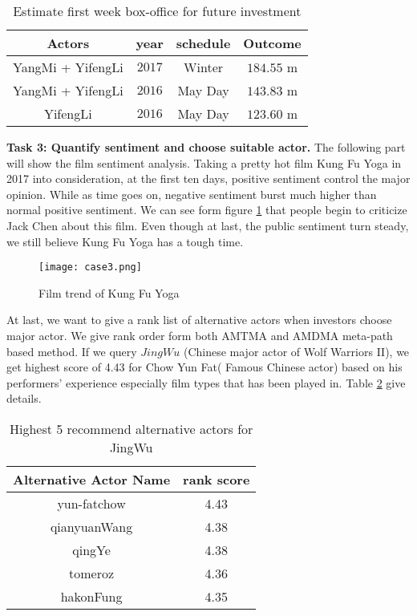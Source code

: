 \begin{table}[!htb]
  \centering
  \begin{tabular}{c|c|c|c}
  \hline
  Actors & year & schedule & Outcome\\
  \hline
  YangMi + YifengLi& $2017$ & Winter & $184.55$ m  \\
  \hline
  YangMi + YifengLi& $2016$ & May Day & $143.83$ m\\
  \hline
  YifengLi& $2016$ & May Day & $123.60$ m\\
  \hline
  \end{tabular}
  \caption{Estimate first week box-office for future investment}
  \label{tab:pred}
\end{table}

\par \textbf{Task 3: Quantify sentiment and choose suitable actor.} The following part will show the film sentiment analysis. Taking a pretty hot film Kung Fu Yoga in 2017 into consideration, at the first ten days, positive sentiment control the major opinion. While as time goes on, negative sentiment burst much higher than normal positive sentiment. We can see form figure \ref{fig:case3} that people begin to criticize Jack Chen about this film. Even though at last, the public sentiment turn steady, we still believe Kung Fu Yoga has a tough time.

\begin{figure}[!htbp]
\centering
\texttt{[image: case3.png]}
\caption{Film trend of Kung Fu Yoga}
\label{fig:case3}
\end{figure}

At last, we want to give a rank list of alternative actors when investors choose major actor. We give rank order form both AMTMA and AMDMA meta-path based method. If we query $JingWu$ (Chinese major actor of  Wolf Warriors II), we get highest score of 4.43 for Chow Yun Fat( Famous Chinese actor) based on his performers' experience especially film types that has been played in. Table \ref{tab:alter} give details.

\begin{table}[!htb]
  \centering
  \begin{tabular}{c|c}
  \hline
  Alternative Actor Name & rank score\\
  \hline
  yun-fatchow & 4.43  \\
  \hline
  qianyuanWang & 4.38\\
  \hline
  qingYe & 4.38\\
  \hline
  tomeroz & 4.36\\
  \hline
  hakonFung & 4.35\\
  \hline
  \end{tabular}
  \caption{Highest 5 recommend alternative actors for JingWu}
  \label{tab:alter}
\end{table}
